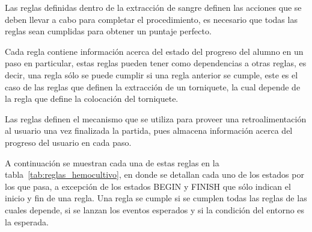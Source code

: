 Las reglas definidas dentro de la extracción de sangre definen las acciones
que se deben llevar a cabo para completar el procedimiento, es necesario que
todas las reglas sean cumplidas para obtener un puntaje perfecto.

Cada regla contiene información acerca del estado del progreso del alumno en un
paso en particular, estas reglas pueden tener como dependencias a otras reglas,
es decir, una regla sólo se puede cumplir si una regla anterior se cumple, este
es el caso de las reglas que definen la extracción de un torniquete, la cual
depende de la regla que define la colocación del torniquete.  

Las reglas definen el mecanismo que se utiliza para proveer una retroalimentación
al usuario una vez finalizada la partida, pues almacena información 
acerca del progreso del usuario en cada paso.

A continuación se muestran cada una de estas reglas en la
tabla~\ref{tab:reglas_hemocultivo}, en donde se detallan cada uno de los estados
por los que pasa, a excepción de los estados BEGIN y FINISH que sólo indican el
inicio y fin de una regla. Una regla se cumple si se cumplen todas las reglas de
las cuales depende, si se lanzan los eventos esperados y si la condición del
entorno es la esperada.


